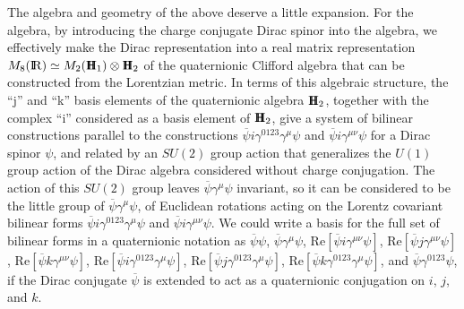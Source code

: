 \documentclass[a4paper,twocolumn,showpacs,preprintnumbers,aps]{revtex4}
\begin{document}
The algebra and geometry of the above deserve a little expansion. For the algebra,
by introducing the charge conjugate Dirac spinor into the algebra, we effectively make the
Dirac representation into a real matrix representation
$M_8({\mathrm{I\hspace{-.2em}R}})\simeq M_2({\mathrm{H\hspace{-.65em}H}}_1)\otimes {\mathrm{H\hspace{-.65em}H}}_2$
of the quaternionic Clifford algebra that can be constructed from the Lorentzian metric.
In terms of this algebraic structure, the ``j'' and ``k'' basis elements of the quaternionic
algebra ${\mathrm{H\hspace{-.65em}H}}_2$, together with the complex ``i'' considered as a basis element of
${\mathrm{H\hspace{-.65em}H}}_2$, give a system of bilinear constructions parallel to the constructions
$\overline{\psi}i\gamma^{0123}\gamma^\mu\psi$ and $\overline{\psi}i\gamma^{\mu\nu}\psi$ for
a Dirac spinor $\psi$, and related by an $SU(2)$ group action that generalizes the $U(1)$
group action of the Dirac algebra considered without charge conjugation. The action of
this $SU(2)$ group leaves $\overline{\psi}\gamma^\mu\psi$ invariant, so it can be
considered to be the little group of $\overline{\psi}\gamma^\mu\psi$, of Euclidean rotations
acting on the Lorentz covariant bilinear forms
$\overline{\psi}i\gamma^{0123}\gamma^\mu\psi$ and $\overline{\psi}i\gamma^{\mu\nu}\psi$.
We could write a basis for the full set of bilinear forms in a quaternionic notation as
$\overline{\psi}\psi$,
$\overline{\psi}\gamma^\mu\psi$, 
$\mathrm{Re}[\overline{\psi}i\gamma^{\mu\nu}\psi]$,
$\mathrm{Re}[\overline{\psi}j\gamma^{\mu\nu}\psi]$,
$\mathrm{Re}[\overline{\psi}k\gamma^{\mu\nu}\psi]$,
$\mathrm{Re}[\overline{\psi}i\gamma^{0123}\gamma^\mu\psi]$,
$\mathrm{Re}[\overline{\psi}j\gamma^{0123}\gamma^\mu\psi]$,
$\mathrm{Re}[\overline{\psi}k\gamma^{0123}\gamma^\mu\psi]$, and
$\overline{\psi}\gamma^{0123}\psi$, if the Dirac conjugate $\overline{\psi}$
is extended to act as a quaternionic conjugation on $i$, $j$, and $k$.
\end{document}
